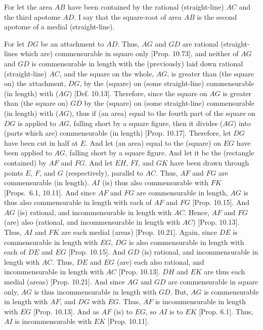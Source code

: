 \begin{Parallel}{}{}
{\epsfysize=1.3in
\centerline{}

For let the area $AB$ have been contained by the rational (straight-line)
$AC$ and the third apotome $AD$. I say that the square-root of area $AB$
is the second apotome of a medial (straight-line).

For let $DG$ be an attachment to $AD$. Thus, $AG$ and $GD$ are rational (straight-lines which are) commensurable in square only [Prop. 10.73], and neither of $AG$ and $GD$
is commensurable in length with the (previously) laid down rational (straight-line) $AC$, and the square on the whole, $AG$, is greater than
(the square on) the attachment, $DG$, by the (square) on (some straight-line)
commensurable (in length) with ($AG$) [Def. 10.13]. 
Therefore, since the square on $AG$ is greater than (the square on)
$GD$ by the (square) on (some straight-line) commensurable (in length)
with ($AG$), thus if (an area) equal to the fourth part of the square on $DG$
is applied to $AG$, falling short by a square figure, then it divides ($AG$)
into (parts which are) commensurable (in length) [Prop. 10.17]. Therefore, let $DG$ have been
cut in half at $E$. And let (an area) equal to the (square) on $EG$
have been applied to $AG$, falling short by a square figure.
And let it be the (rectangle contained) by $AF$ and $FG$. And let
$EH$, $FI$, and $GK$ have been drawn through points $E$, $F$, and $G$
(respectively), parallel to $AC$. Thus, $AF$ and $FG$ are
commensurable (in length). $AI$ (is) thus also commensurable with
$FK$ [Props.~6.1, 10.11]. 
 And since $AF$ and $FG$ are commensurable
in length, $AG$ is thus also commensurable in length with each of
$AF$ and $FG$ [Prop. 10.15]. And
$AG$ (is) rational, and incommensurable in length with $AC$. 
Hence, $AF$ and $FG$ (are) also (rational, and incommensurable in length
with $AC$) [Prop. 10.13]. 
Thus, $AI$ and $FK$ are each medial (areas) [Prop. 10.21]. Again, since $DE$ is commensurable
in length with $EG$, $DG$ is also commensurable
in length with each of $DE$ and $EG$ [Prop. 10.15]. And $GD$ (is) rational, and incommensurable in length with $AC$. Thus, $DE$ and $EG$ (are)
each also rational, and incommensurable in length with $AC$ [Prop. 10.13]. $DH$ and $EK$ are thus
each medial (areas) [Prop. 10.21]. And since 
$AG$ and $GD$ are commensurable in square only, $AG$ is thus
incommensurable in length with $GD$. But, $AG$ is commensurable in
length with $AF$, and $DG$ with $EG$. Thus, $AF$ is incommensurable
in length with $EG$ [Prop. 10.13]. 
And as $AF$ (is) to $EG$, so $AI$ is to $EK$ [Prop. 6.1]. Thus, $AI$ is incommensurable with $EK$ [Prop. 10.11].

}
\end{Parallel}
